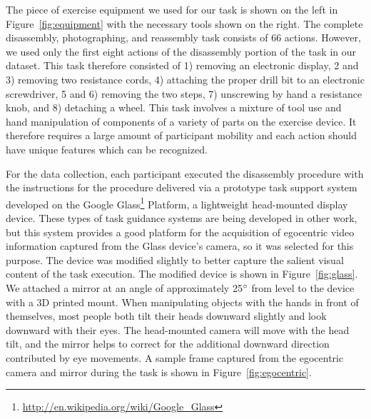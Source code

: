 \documentclass[10pt,twocolumn,letterpaper]{article}
\begin{document}
The piece of exercise equipment we used for our task is shown on the left in Figure~\ref{fig:equipment} with the necessary tools shown on the right. The complete disassembly, photographing, and reassembly task consists of 66 actions. However, we used only the first eight actions of the disassembly portion of the task in our dataset. This task therefore consisted of 1) removing an electronic display, 2 and 3) removing two resistance cords, 4) attaching the proper drill bit to an electronic screwdriver, 5 and 6) removing the two steps, 7) unscrewing by hand a resistance knob, and 8) detaching a wheel. This task involves a mixture of tool use and hand manipulation of components of a variety of parts on the exercise device. It therefore requires a large amount of participant mobility and each action should have unique features which can be recognized.

For the data collection, each participant executed the disassembly procedure with the instructions for the procedure delivered via a prototype task support system developed on the Google Glass\footnote{\href{http://en.wikipedia.org/wiki/Google_Glass}{http://en.wikipedia.org/wiki/Google\_Glass}} Platform, a lightweight head-mounted display device. These types of task guidance systems are being developed in other work, but this system provides a good platform for the acquisition of egocentric video information captured from the Glass device's camera, so it was selected for this purpose. The device was modified slightly to better capture the salient visual content of the task execution. The modified device is shown in Figure~\ref{fig:glass}. We attached a mirror  at an angle of approximately 25$\degree$ from level to the device with a 3D printed mount. When manipulating objects with the hands in front of themselves, most people both tilt their heads downward slightly and look downward with their eyes. The head-mounted camera will move with the head tilt, and the mirror helps to correct for the additional downward direction contributed by eye movements. A sample frame captured from the egocentric camera and mirror during the task is shown in Figure~\ref{fig:egocentric}.
\end{document}
